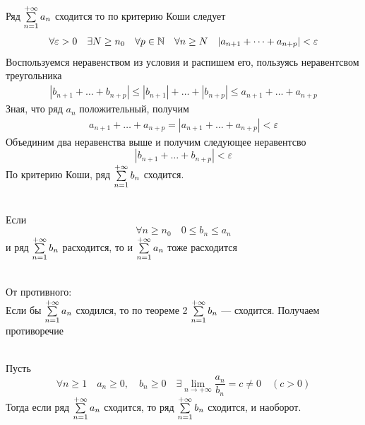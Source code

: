 \begin{Proof}~\\
    Ряд $\sum\limits_{n = 1}^{+\infty}{a_n}$ сходится то по критерию Коши следует
    \begin{gather*}
       \forall \varepsilon > 0 \quad \exists N \geq n_0 \quad \forall p \in \mathbb{N} \quad \forall n \geq N \quad |a_{n+1} + \dots + a_{n+p}| < \varepsilon
    \end{gather*}
	Воспользуемся неравенством из условия и распишем его, пользуясь неравентсвом треугольника
    \begin{gather*}
        |b_{n+1} + \dots + b_{n+p}| \leqslant |b_{n+1}| + \dots + |b_{n+p}| \leqslant a_{n+1} + \dots + a_{n+p}  
    \end{gather*}
    Зная, что ряд $a_n$ положительный, получим
    \begin{gather*}
       a_{n+1} + \dots + a_{n+p} = |a_{n+1} + \dots + a_{n+p}| < \varepsilon
    \end{gather*}
    Объединим два неравенства выше и получим следующее неравентсво
    \[
        |b_{n+1} + \dots + b_{n+p}| < \varepsilon
    \]
    По критерию Коши, ряд $\sum\limits_{n = 1}^{+\infty}{b_n}$ сходится.
\end{Proof}

\begin{Seq}~\\
    Если
	\[
        \forall n \geq n_0 \quad 0 \leqslant b_n \leqslant a_n 
    \] 
    и ряд $\sum\limits_{n = 1}^{+\infty}{b_n}$ расходится, то и $\sum\limits_{n = 1}^{+\infty}{a_n}$ тоже расходится
\end{Seq}

\begin{Proof}~\\
	От противного:\\
	Если бы $\sum\limits_{n = 1}^{+\infty}{a_n}$ сходился, то по теореме 2 $\sum\limits_{n = 1}^{+\infty}{b_n}$ --- сходится. Получаем противоречие
\end{Proof}

\begin{Th}~\\
	Пусть 
    \[
        \forall n \geq 1 \quad a_n \geqslant 0, \quad b_n \geqslant 0 \quad \exists \lim_{n \to +\infty}\frac{a_n}{b_n} = c \neq 0 \quad (c > 0)
    \]
	Тогда если ряд $\sum\limits_{n = 1}^{+\infty}{a_n}$ сходится, то ряд $\sum\limits_{n = 1}^{+\infty}{b_n}$ сходится, и наоборот.
\end{Th}

